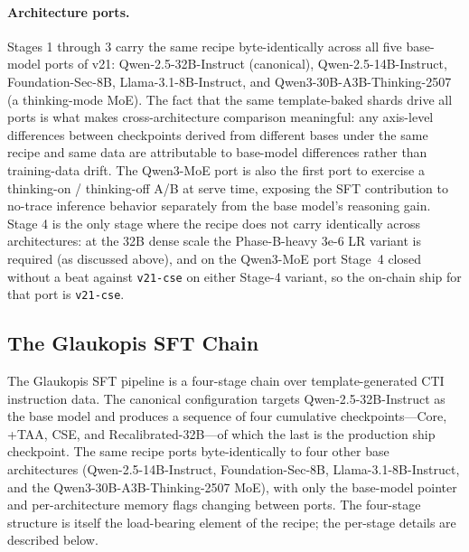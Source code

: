 \documentclass[unnumsec,webpdf,contemporary,large]{oup-authoring-template}
\theoremstyle{thmstyleone}
\theoremstyle{thmstyletwo}
\theoremstyle{thmstylethree}
\begin{document}
\paragraph{Architecture ports.}
Stages 1 through 3 carry the same recipe byte-identically across all five base-model ports of v21: Qwen-2.5-32B-Instruct (canonical), Qwen-2.5-14B-Instruct, Foundation-Sec-8B, Llama-3.1-8B-Instruct, and Qwen3-30B-A3B-Thinking-2507 (a thinking-mode MoE). The fact that the same template-baked shards drive all ports is what makes cross-architecture comparison meaningful: any axis-level differences between checkpoints derived from different bases under the same recipe and same data are attributable to base-model differences rather than training-data drift. The Qwen3-MoE port is also the first port to exercise a thinking-on / thinking-off A/B at serve time, exposing the SFT contribution to no-trace inference behavior separately from the base model's reasoning gain. Stage 4 is the only stage where the recipe does not carry identically across architectures: at the 32B dense scale the Phase-B-heavy 3e-6 LR variant is required (as discussed above), and on the Qwen3-MoE port Stage~4 closed without a beat against \texttt{v21-cse} on either Stage-4 variant, so the on-chain ship for that port is \texttt{v21-cse}.

\subsection{The Glaukopis SFT Chain}
\label{sec:glaukopis-sft}

The Glaukopis SFT pipeline is a four-stage chain over template-generated CTI instruction data. The canonical configuration targets Qwen-2.5-32B-Instruct as the base model and produces a sequence of four cumulative checkpoints---Core, +TAA, CSE, and Recalibrated-32B---of which the last is the production ship checkpoint. The same recipe ports byte-identically to four other base architectures (Qwen-2.5-14B-Instruct, Foundation-Sec-8B, Llama-3.1-8B-Instruct, and the Qwen3-30B-A3B-Thinking-2507 MoE), with only the base-model pointer and per-architecture memory flags changing between ports. The four-stage structure is itself the load-bearing element of the recipe; the per-stage details are described below.
\end{document}
